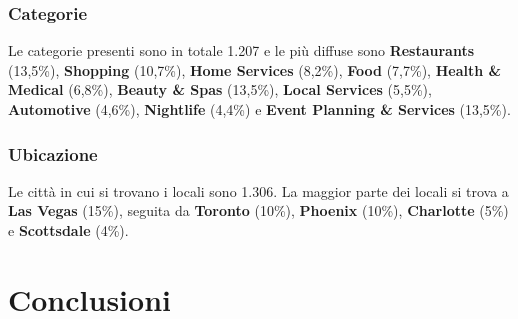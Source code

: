 \documentclass[12pt]{article}
\begin{document}
\subsubsection{Categorie}
Le categorie presenti sono in totale 1.207 e le più diffuse sono \textbf{Restaurants} (13,5\%), \textbf{Shopping} (10,7\%), \textbf{Home Services} (8,2\%), \textbf{Food} (7,7\%), \textbf{Health \& Medical} (6,8\%), \textbf{Beauty \& Spas} (13,5\%), \textbf{Local Services} (5,5\%), \textbf{Automotive} (4,6\%), \textbf{Nightlife} (4,4\%) e \textbf{Event Planning \& Services} (13,5\%).

\subsubsection{Ubicazione}
Le città in cui si trovano i locali sono 1.306. La maggior parte dei locali si trova a \textbf{Las Vegas} (15\%), seguita da \textbf{Toronto} (10\%), \textbf{Phoenix} (10\%), \textbf{Charlotte} (5\%) e \textbf{Scottsdale} (4\%).



\section{Conclusioni}

\printbibliography[title={Riferimenti}]
\end{document}
